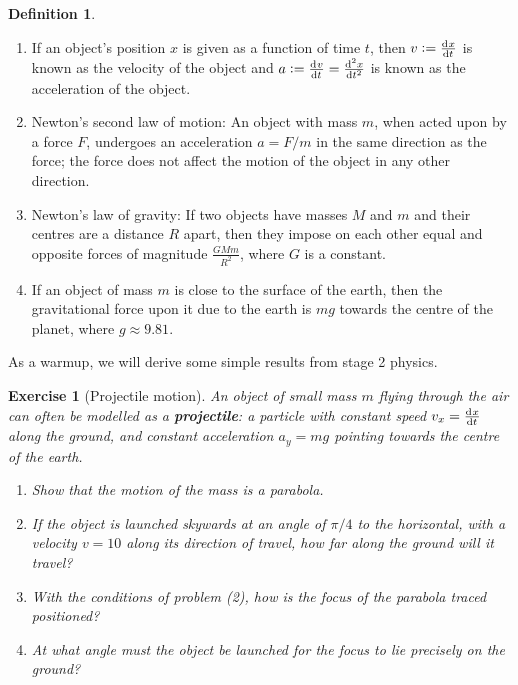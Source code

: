 \documentclass[a4paper,leqno,10pt]{article}
\theoremstyle{exercise}
\newtheorem{Exercise}{Exercise}
\newenvironment{exercise}
  {\begin{mdframed}\begin{Exercise}}
  {\end{Exercise}\end{mdframed}}
\theoremstyle{plain}
\theoremstyle{definition}
\newtheorem*{defn}{Definition}
\theoremstyle{remark}
\newcommand{\df}{\textbf}
\begin{document}
\begin{defn}\leavevmode
  \begin{enumerate}
    \item If an object's position $ x $ is given as a function of time $ t $, then $ v := \od{x}{t} $ is known as
          the velocity of the object and $ a := \od{v}{t} = \od[2]{x}{t} $ is known as the acceleration of the object.
    \item Newton's second law of motion: An object with mass $ m $, when acted upon by a force $ F $, undergoes an acceleration $ a = F/m $ in
          the same direction as the force; the force does not affect the motion of the object in any other direction.
    \item Newton's law of gravity: If two objects have masses $ M $ and $ m $ and their centres are a distance $ R $ apart, then they impose
          on each other equal and opposite forces of magnitude $ \frac{GMm}{R^2} $, where $ G $ is a constant.
    \item If an object of mass $ m $ is close to the surface of the earth, then the gravitational force upon it
          due to the earth is $ mg $ towards the centre of the planet, where $ g \approx 9.81 $.
  \end{enumerate}
\end{defn}

As a warmup, we will derive some simple results from stage 2 physics.

\begin{exercise}[Projectile motion]
  An object of small mass $ m $ flying through the air can often be modelled as a \df{projectile}: a particle
  with constant speed $ v_x = \od{x}{t} $ along the ground, and constant acceleration $ a_y = mg $ pointing
  towards the centre of the earth.

  \begin{enumerate}
    \item Show that the motion of the mass is a parabola.
    \item If the object is launched skywards at an angle of $ \pi/4 $ to the horizontal, with a
           velocity $ v = 10 $ along its direction of travel, how far along the ground will it travel?
    \item With the conditions of problem (2), how is the focus of the parabola traced positioned?
    \item At what angle must the object be launched for the focus to lie precisely on the ground?
  \end{enumerate}
\end{exercise}
\end{document}
